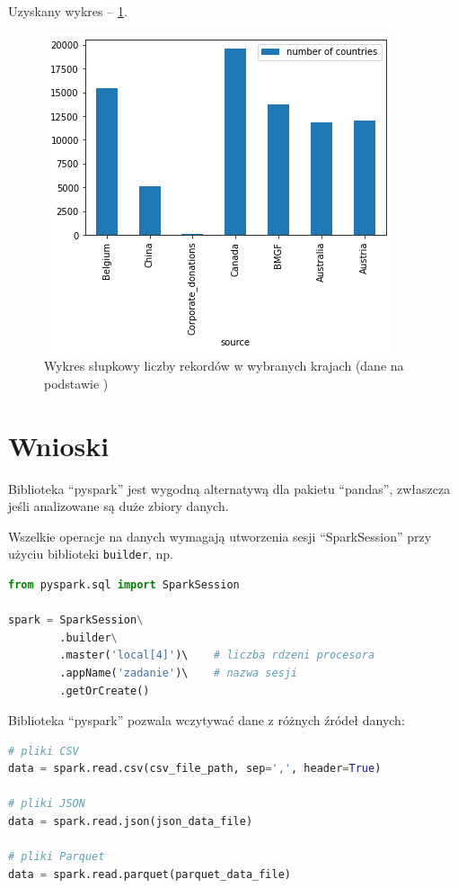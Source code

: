 \documentclass[11pt]{report}
\newcounter{zadanie}
\begin{document}
Uzyskany wykres -- \ref{fig:wykres1}.

\begin{figure}[h]
    \caption{Wykres słupkowy liczby rekordów w wybranych krajach (dane na podstawie \cite{daneMedyczne})}
    \label{fig:wykres1}
    \centering
    \includegraphics[width=.8\textwidth]{download}
\end{figure}

\chapter*{Wnioski}

Biblioteka \enquote{pyspark} jest wygodną alternatywą dla pakietu \enquote{pandas}, zwłaszcza jeśli analizowane są duże zbiory danych.

Wszelkie operacje na danych wymagają utworzenia sesji \enquote{SparkSession} przy użyciu biblioteki \texttt{builder}, np.

\begin{lstlisting}[language=Python]
from pyspark.sql import SparkSession

spark = SparkSession\
        .builder\
        .master('local[4]')\    # liczba rdzeni procesora
        .appName('zadanie')\    # nazwa sesji
        .getOrCreate()
\end{lstlisting}

Biblioteka \enquote{pyspark} pozwala wczytywać dane z różnych źródeł danych:

\begin{lstlisting}[language=Python]
# pliki CSV
data = spark.read.csv(csv_file_path, sep=',', header=True)

# pliki JSON
data = spark.read.json(json_data_file)

# pliki Parquet
data = spark.read.parquet(parquet_data_file)
\end{lstlisting}
\end{document}
